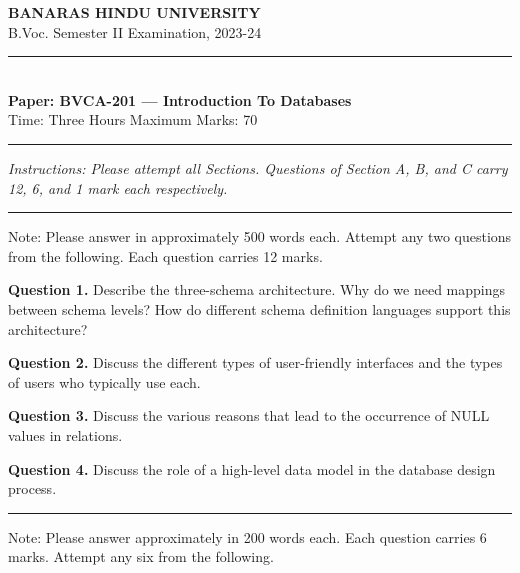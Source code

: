 \documentclass[11pt,a4paper]{article}
\begin{document}
\begin{center}
  {\large\bfseries BANARAS HINDU UNIVERSITY}\\[2pt]
  {\normalsize B.Voc. Semester II Examination, 2023-24}\\[6pt]
  \rule{0.8\linewidth}{0.5pt}\\[6pt]
  {\large\bfseries Paper: BVCA-201 --- Introduction To Databases}\\[4pt]
  {\normalsize Time: Three Hours \hfill Maximum Marks: 70}
\end{center}

\rule{\linewidth}{0.4pt}

\smallskip
\noindent\textit{Instructions: Please attempt all Sections. Questions of Section A, B, and C carry 12, 6, and 1 mark each respectively.}

\bigskip

\bigskip{}
\rule{\linewidth}{0.4pt}\smallskip

Note: Please answer in approximately 500 words each. Attempt any two questions from the following. Each question carries 12 marks.

\medskip\noindent\textbf{Question 1.} Describe the three-schema architecture. Why do we need mappings between schema levels? How do different schema definition languages support this architecture?

\medskip\noindent\textbf{Question 2.} Discuss the different types of user-friendly interfaces and the types of users who typically use each.

\medskip\noindent\textbf{Question 3.} Discuss the various reasons that lead to the occurrence of NULL values in relations.

\medskip\noindent\textbf{Question 4.} Discuss the role of a high-level data model in the database design process.

\bigskip{}
\rule{\linewidth}{0.4pt}\smallskip

Note: Please answer approximately in 200 words each. Each question carries 6 marks. Attempt any six from the following.
\end{document}
